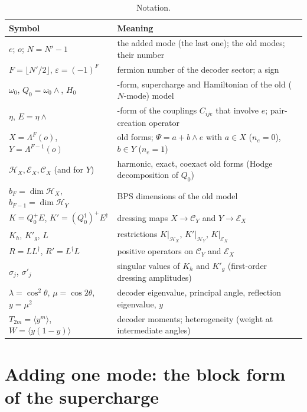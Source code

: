 \documentclass[11pt]{article}
\newcommand{\Np}{N'}
\newcommand{\eps}{\varepsilon}
\newcommand{\Hc}{\mathcal H}
\newcommand{\Ec}{\mathcal E}
\newcommand{\Cc}{\mathcal C}
\newcommand{\Kh}{K_h}
\newcommand{\Kg}{{K'_g}}
\theoremstyle{plain}
\theoremstyle{remark}
\numberwithin{equation}{section}
\begin{document}
\begin{table}[ht]
\centering\small
\caption{Notation.}\label{tab:notation}
\begin{tabular}{@{}>{\raggedright\arraybackslash}p{}>{\raggedright\arraybackslash}p{}@{}}\toprule
Symbol & Meaning\\\midrule
$e$; $o$; $N=\Np-1$ & the added mode (the last one); the old modes; their number\\
$F=\lfloor\Np/2\rfloor$, $\eps=(-1)^F$ & fermion number of the decoder sector; a sign\\
$\omega_0$, $Q_0=\omega_0\wedge$, $H_0$ & 3-form, supercharge and Hamiltonian of the old ($N$-mode) model\\
$\eta$, $E=\eta\wedge$ & 2-form of the couplings $C_{ije}$ that involve $e$; pair-creation operator\\
$X=\Lambda^F(o)$, $Y=\Lambda^{F-1}(o)$ & old forms; $\Psi=a+b\wedge e$ with $a\in X$ ($n_e=0$), $b\in Y$ ($n_e=1$)\\
$\Hc_X,\Ec_X,\Cc_X$ (and for $Y$) & harmonic, exact, coexact old forms (Hodge decomposition of $Q_0$)\\
$b_F=\dim\Hc_X$, $b_{F-1}=\dim\Hc_Y$ & BPS dimensions of the old model\\
$K=Q_0^+E$, $K'=(Q_0^\dagger)^+E^\dagger$ & dressing maps $X\to\Cc_Y$ and $Y\to\Ec_X$\\
$\Kh$, $\Kg$, $L$ & restrictions $K|_{\Hc_X}$, $K'|_{\Hc_Y}$, $K|_{\Ec_X}$\\
$R=LL^\dagger$, $R'=L^\dagger L$ & positive operators on $\Cc_Y$ and $\Ec_X$\\
$\sigma_j$, $\sigma'_j$ & singular values of $\Kh$ and $\Kg$ (first-order dressing amplitudes)\\
$\lambda=\cos^2\theta$, $\mu=\cos2\theta$, $y=\mu^2$ & decoder eigenvalue, principal angle, reflection eigenvalue, $y$\\
$T_{2m}=\langle y^m\rangle$, $W=\langle y(1-y)\rangle$ & decoder moments; heterogeneity (weight at intermediate angles)\\\bottomrule
\end{tabular}
\end{table}

\section{Adding one mode: the block form of the supercharge}\label{sec:block}
\end{document}
